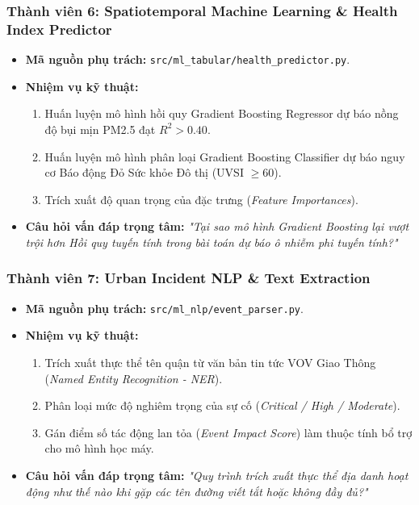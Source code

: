 \documentclass[12pt,a4paper]{article}
\begin{document}
\subsubsection{Thành viên 6: Spatiotemporal Machine Learning \& Health Index Predictor}
\begin{itemize}
    \item \textbf{Mã nguồn phụ trách:} \texttt{src/ml\_tabular/health\_predictor.py}.
    \item \textbf{Nhiệm vụ kỹ thuật:}
    \begin{enumerate}
        \item Huấn luyện mô hình hồi quy Gradient Boosting Regressor dự báo nồng độ bụi mịn PM2.5 đạt $R^2 > 0.40$.
        \item Huấn luyện mô hình phân loại Gradient Boosting Classifier dự báo nguy cơ Báo động Đỏ Sức khỏe Đô thị (UVSI $\ge 60$).
        \item Trích xuất độ quan trọng của đặc trưng (\textit{Feature Importances}).
    \end{enumerate}
    \item \textbf{Câu hỏi vấn đáp trọng tâm:} \textit{"Tại sao mô hình Gradient Boosting lại vượt trội hơn Hồi quy tuyến tính trong bài toán dự báo ô nhiễm phi tuyến tính?"}
\end{itemize}

\subsubsection{Thành viên 7: Urban Incident NLP \& Text Extraction}
\begin{itemize}
    \item \textbf{Mã nguồn phụ trách:} \texttt{src/ml\_nlp/event\_parser.py}.
    \item \textbf{Nhiệm vụ kỹ thuật:}
    \begin{enumerate}
        \item Trích xuất thực thể tên quận từ văn bản tin tức VOV Giao Thông (\textit{Named Entity Recognition - NER}).
        \item Phân loại mức độ nghiêm trọng của sự cố (\textit{Critical / High / Moderate}).
        \item Gán điểm số tác động lan tỏa (\textit{Event Impact Score}) làm thuộc tính bổ trợ cho mô hình học máy.
    \end{enumerate}
    \item \textbf{Câu hỏi vấn đáp trọng tâm:} \textit{"Quy trình trích xuất thực thể địa danh hoạt động như thế nào khi gặp các tên đường viết tắt hoặc không đầy đủ?"}
\end{itemize}
\end{document}
